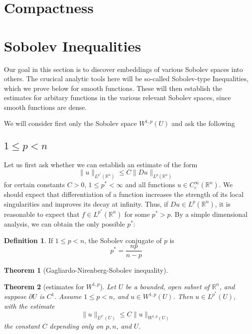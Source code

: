 \documentclass{article}
\newtheorem{theorem}{Theorem}[section]
\theoremstyle{definition}
\newtheorem{definition}{Definition}[section]
\begin{document}
\section{Compactness}




\section{Sobolev Inequalities}
Our goal in this section is to discover embeddings of various Sobolev spaces into others. 
The crucical analytic tools here will be so-called Sobolev-type Inequalities, which we prove below for smooth functions.
These will then establish the estimates for arbitary functions in the various relevant Sobolev spaces, since smooth functions are dense.

We will consider first only the Sobolev space $W^{1,p}(U)$ and ask the following 
\subsection{$1\le p<n$}

Let us first ask whether we can establish an estimate of the form 
\[ \|u\|_{L^{p^*}(\mathbb{R}^n)}\le C\|Du\|_{L^p(\mathbb{R}^n)}\] 
for certain constants $C>0$, $1\le p^*<\infty$ and all functions $u\in C^\infty_c(\mathbb{R}^n)$.
We should expect that differentiation of a function increases the strength of its local singularities and improves its decay at infinity.
Thus, if $Du\in L^p(\mathbb{R}^n)$, it is reasonable to expect that $f\in L^{p^*}(\mathbb{R}^n)$ for some $p^*>p$.
By a simple dimensional analysis, we can obtain the only possible $p^*$:
\begin{definition}
    If $1\le p<n$, the Sobolev conjugate of $p$ is 
    \[p^*=\frac{np}{n-p}\] 
\end{definition}


\begin{theorem}[Gagliardo-Nirenberg-Sobolev inequality]
    
\end{theorem}

\begin{theorem}[estimates for $W^{1,p}$]
    Let $U$ be a bounded, open subset of $\mathbb{R}^n$, and suppose $\partial U$ is $C^1$. Assume $1\le p<n$, and $u\in W^{1,p}(U)$.
    Then $u\in L^{p^*}(U)$, with the estimate 
    \[ \|u\|_{L^{p^*}(U)}\le C\|u\|_{W^{1,p}(U)}\] 
    the constant $C$ depending only on $p,n$, and $U$.
\end{theorem}
\end{document}
